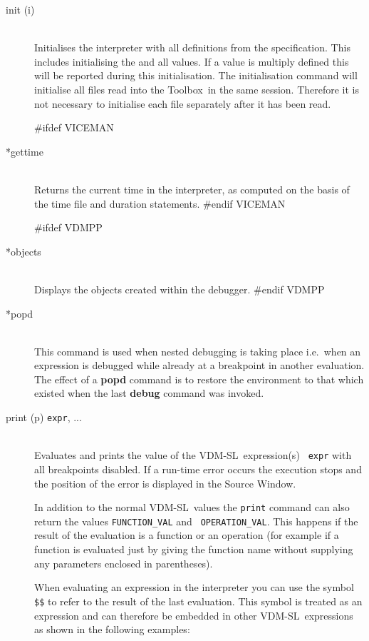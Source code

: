 \documentclass[\pformat,12pt]{article}
\newcommand{\vdmslpp}{VDM-SL}
\newcommand{\Toolbox}{Toolbox}
\newcommand{\vdmslpp}{VDM++}
\newcommand{\Toolbox}{Toolbox}
\newcommand{\guicmd}[1]{{\sf #1}}
\newcommand{\guicmd}[1]{{\gt #1}}
\begin{document}
\begin{description}
\item[init (i)] \mbox{}\\ Initialises
  the interpreter with all definitions from the specification. This
  includes initialising the
   and all
  values. If a value is multiply defined this will be reported during
  this initialisation. The initialisation command will initialise all
  files read into the \Toolbox\ in the same session. Therefore it is
  not necessary to initialise each file separately after it has been
  read.
  
#ifdef VICEMAN
\item[*gettime]\mbox{}\\
  Returns the current time in the interpreter, as computed 
  on the basis of the time file and duration statements.
#endif VICEMAN

#ifdef VDMPP
\item[*objects] \mbox{}\\
  Displays the objects created within the debugger.
#endif VDMPP

\item[*popd] \mbox{}\\
  This command is used when nested debugging is taking place i.e.\ when
  an expression is debugged while already at a breakpoint in another
  evaluation. The effect of a 
  \textbf{popd} command is to restore the environment to that which
  existed when the last \textbf{debug} command was invoked.

\item[print (p) {\tt expr}, ...] \mbox{}\\
  Evaluates and prints the value of the \vdmslpp\ expression(s) {\tt
    expr} with all breakpoints disabled. If a run-time error occurs
  the execution stops and the position of the error is
  displayed in the \guicmd{Source Window}.
  
  In addition to the normal \vdmslpp\ values the {\tt print} command
  can also return the values {\tt FUNCTION\_VAL} and {\tt
    OPERATION\_VAL}\@.  This happens if the result of the evaluation is
  a function or an operation (for example if a function
  is evaluated just by giving the function name without supplying any
  parameters enclosed in parentheses).
  
  When evaluating an expression in the interpreter you can use the 
  symbol {\tt \$\$}\index{\$\$} to refer to the result of the last
  evaluation. This symbol is treated as an expression and can
  therefore be embedded in other \vdmslpp\ expressions as shown in
  the following examples:


\end{description}
\end{document}
